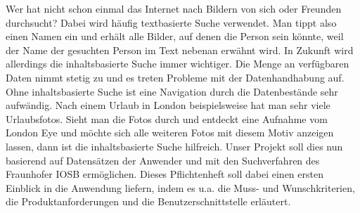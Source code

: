 Wer hat nicht schon einmal das Internet nach Bildern von sich oder Freunden durchsucht? Dabei wird häufig textbasierte Suche verwendet. Man tippt also einen Namen ein und erhält alle Bilder, auf denen die Person sein könnte, weil der Name der gesuchten Person im Text nebenan erwähnt wird. 
\newline
In Zukunft wird allerdings die inhaltsbasierte Suche immer wichtiger. Die Menge an verfügbaren Daten nimmt stetig zu und es treten Probleme mit der Datenhandhabung auf. Ohne inhaltsbasierte Suche ist eine Navigation durch die Datenbestände sehr aufwändig.
Nach einem Urlaub in London beispielsweise hat man sehr viele Urlaubsfotos. Sieht man die Fotos durch und entdeckt eine Aufnahme vom London Eye und möchte sich alle weiteren Fotos mit diesem Motiv anzeigen lassen, dann ist die inhaltsbasierte Suche hilfreich.
\newline
Unser Projekt soll dies nun basierend auf Datensätzen der Anwender und mit den Suchverfahren des Fraunhofer IOSB ermöglichen.
\newline
Dieses Pflichtenheft soll dabei einen ersten Einblick in die Anwendung liefern, indem es u.a. die Muss- und Wunschkriterien, die Produktanforderungen und die Benutzerschnittstelle erläutert.
\pagebreak